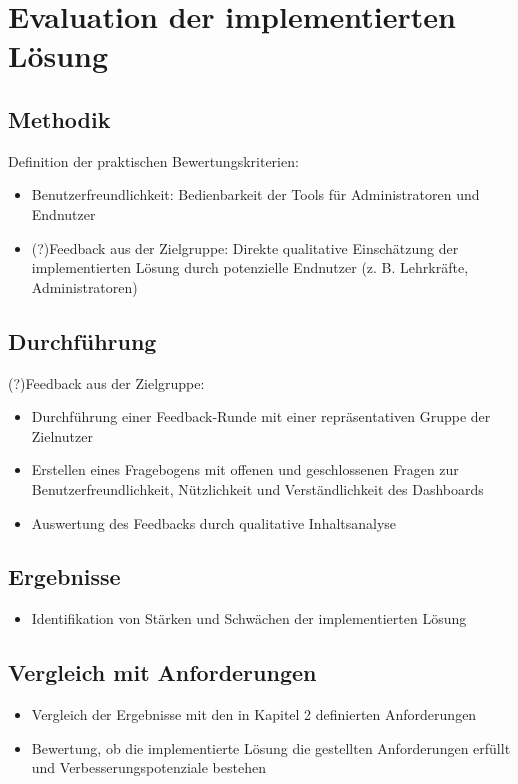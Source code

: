 \chapter{Evaluation der implementierten Lösung}
\label{ch:evaluation}

\section{Methodik}
Definition der praktischen Bewertungskriterien:
\begin{itemize}
    \item Benutzerfreundlichkeit: Bedienbarkeit der Tools für Administratoren und Endnutzer
    \item (?)Feedback aus der Zielgruppe: Direkte qualitative Einschätzung der implementierten Lösung durch potenzielle Endnutzer (z. B. Lehrkräfte, Administratoren)
\end{itemize}

\section{Durchführung}
(?)Feedback aus der Zielgruppe:
\begin{itemize}
    \item Durchführung einer Feedback-Runde mit einer repräsentativen Gruppe der Zielnutzer
    \item Erstellen eines Fragebogens mit offenen und geschlossenen Fragen zur Benutzerfreundlichkeit, Nützlichkeit und Verständlichkeit des Dashboards
    \item Auswertung des Feedbacks durch qualitative Inhaltsanalyse
\end{itemize}

\section{Ergebnisse}
\begin{itemize}
    \item Identifikation von Stärken und Schwächen der implementierten Lösung
\end{itemize}

\section{Vergleich mit Anforderungen}
\begin{itemize}
    \item Vergleich der Ergebnisse mit den in Kapitel 2 definierten Anforderungen
    \item Bewertung, ob die implementierte Lösung die gestellten Anforderungen erfüllt und Verbesserungspotenziale bestehen
\end{itemize}